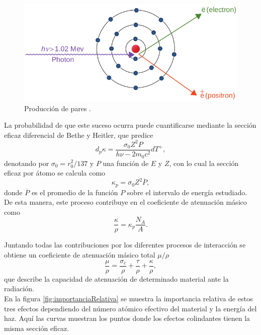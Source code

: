 \begin{figure}[H]
	\centering
	\includegraphics[width=0.7\linewidth]{images/produccionPares.png}
	\caption{Producción de pares \cite{khan2014the}.}
	\label{fig:Pares}
\end{figure}

La probabilidad de que este suceso ocurra puede cuantificarse mediante la sección eficaz diferencial de Bethe y Heitler, que predice 
\begin{equation}
	d_{p}\kappa=\frac{\sigma_0 Z^2 P}{h\nu -2m_0c^2}dT^{+}, 
\end{equation}
denotando por $\sigma_0=r_{0}^2/137$ y $P$ una función de $E$ y $Z$, con lo cual la sección eficaz por átomo se calcula como
\begin{equation}
	\kappa_{p}=\sigma_0Z^2\overline{P},
\end{equation}
donde $\overline{P}$ es el promedio de la función $P$ sobre el intervalo de energía estudiado.\\

De esta manera, este proceso contribuye en el coeficiente de atenuación másico como
\begin{equation}
	\frac{\kappa}{\rho}=\kappa_{p}\frac{N_A}{A}.
\end{equation}

Juntando todas las contribuciones por los diferentes procesos de interacción se obtiene un coeficiente de atenuación másico total $\mu/\rho$
\begin{equation}
	\frac{\mu}{\rho}=\frac{\sigma_c}{\rho}+\frac{\tau}{\rho}+\frac{\kappa}{\rho},
\end{equation}
que describe la capacidad de atenuación de determinado material ante la radiación.\\

En la figura \ref{fig:importanciaRelativa} se muestra la importancia relativa de estos tres efectos dependiendo del número atómico efectivo del material y la energía del haz. Aquí las curvas muestran los puntos donde los efectos colindantes tienen la misma sección eficaz.

